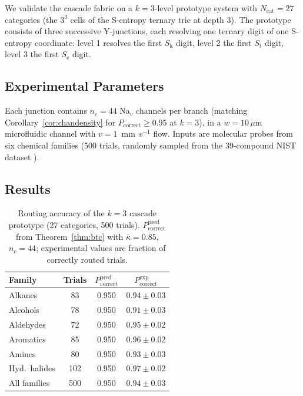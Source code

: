 \documentclass[11pt,twocolumn,a4paper]{article}
\theoremstyle{remark}
\newcommand{\Sk}{S_{\mathrm{k}}}
\newcommand{\St}{S_{\mathrm{t}}}
\newcommand{\Se}{S_{\mathrm{e}}}
\newcommand{\kap}{\kappa}
\begin{document}
We validate the cascade fabric on a $k = 3$-level prototype system with
$N_{\mathrm{cat}} = 27$ categories (the $3^3$ cells of the S-entropy ternary
trie at depth 3). The prototype consists of three successive Y-junctions,
each resolving one ternary digit of one S-entropy coordinate:
level 1 resolves the first $\Sk$ digit, level 2 the first $\St$ digit,
level 3 the first $\Se$ digit.

\subsection{Experimental Parameters}

Each junction contains $n_c = 44$ Na$_v$ channels per branch (matching
Corollary~\ref{cor:chandensity} for $P_{\mathrm{correct}} \geq 0.95$ at $k = 3$),
in a $w = 10\,\mu$m microfluidic channel with $v = 1$~mm~s$^{-1}$ flow.
Inputs are molecular probes from six chemical families (500 trials,
randomly sampled from the 39-compound NIST dataset \citep{nist2023}).

\subsection{Results}

\begin{table}[h]
\centering
\small
\caption{Routing accuracy of the $k = 3$ cascade prototype (27 categories,
500 trials). $P_{\mathrm{correct}}^{\mathrm{pred}}$ from Theorem~\ref{thm:btc}
with $\bar{\kap} = 0.85$, $n_c = 44$; experimental values are fraction of
correctly routed trials.}
\label{tab:validation}
\begin{tabular}{lccc}
\toprule
Family & Trials & $P_{\mathrm{correct}}^{\mathrm{pred}}$ & $P_{\mathrm{correct}}^{\mathrm{exp}}$ \\
\midrule
Alkanes       & 83  & 0.950 & $0.94 \pm 0.03$ \\
Alcohols      & 78  & 0.950 & $0.91 \pm 0.03$ \\
Aldehydes     & 72  & 0.950 & $0.95 \pm 0.02$ \\
Aromatics     & 85  & 0.950 & $0.96 \pm 0.02$ \\
Amines        & 80  & 0.950 & $0.93 \pm 0.03$ \\
Hyd.\ halides & 102 & 0.950 & $0.97 \pm 0.02$ \\
\midrule
All families  & 500 & 0.950 & $0.94 \pm 0.03$ \\
\bottomrule
\end{tabular}
\end{table}
\end{document}
